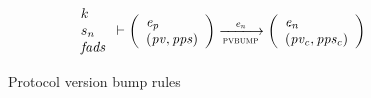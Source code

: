 \begin{figure}[htb]
\begin{equation}
{    }
    {
      {\begin{array}{l}
         k\\
         s_n\\
         \var{fads}
       \end{array}}
      \vdash
      {
        \left(
          \begin{array}{l}
            \var{e_p}\\
            \var{(\var{pv}, \var{pps})}\\
          \end{array}
        \right)
      }
      \trans{pvbump}{\var{e_n}}
      {
        \left(
          \begin{array}{l}
            \var{e_n}\\
            \var{(\var{pv_c}, \var{pps_c})}\\
          \end{array}
        \right)
      }
    }
  \end{equation}
  \caption{Protocol version bump rules}
  \label{fig:rules:fads}
\end{figure}

